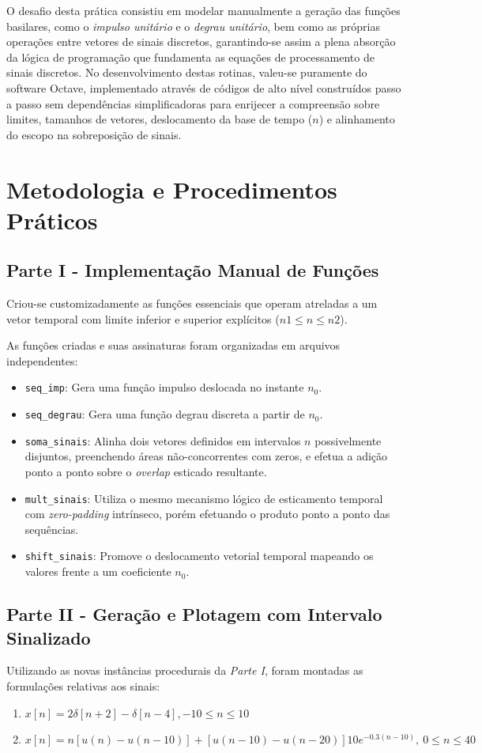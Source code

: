 \documentclass[tcc]{classe_uftex/uftex}
\begin{document}
O desafio desta prática consistiu em modelar manualmente a geração das funções basilares, como o \emph{impulso unitário} e o \emph{degrau unitário}, bem como as próprias operações entre vetores de sinais discretos, garantindo-se assim a plena absorção da lógica de programação que fundamenta as equações de processamento de sinais discretos. No desenvolvimento destas rotinas, valeu-se puramente do software Octave, implementado através de códigos de alto nível construídos passo a passo sem dependências simplificadoras para enrijecer a compreensão sobre limites, tamanhos de vetores, deslocamento da base de tempo ($n$) e alinhamento do escopo na sobreposição de sinais.

\chapter{Metodologia e Procedimentos Práticos}

\section{Parte I - Implementação Manual de Funções}
Criou-se customizadamente as funções essenciais que operam atreladas a um vetor temporal com limite inferior e superior explícitos ($n1 \le n \le n2$).

As funções criadas e suas assinaturas foram organizadas em arquivos independentes:
\begin{itemize}
    \item[\textbf{a)}] \texttt{seq\_imp}: Gera uma função impulso deslocada no instante $n_0$.
    \item[\textbf{b)}] \texttt{seq\_degrau}: Gera uma função degrau discreta a partir de $n_0$.
    \item[\textbf{c)}] \texttt{soma\_sinais}: Alinha dois vetores definidos em intervalos $n$ possivelmente disjuntos, preenchendo áreas não-concorrentes com zeros, e efetua a adição ponto a ponto sobre o \emph{overlap} esticado resultante.
    \item[\textbf{d)}] \texttt{mult\_sinais}: Utiliza o mesmo mecanismo lógico de esticamento temporal com \emph{zero-padding} intrínseco, porém efetuando o produto ponto a ponto das sequências.
    \item[\textbf{e)}] \texttt{shift\_sinais}: Promove o deslocamento vetorial temporal mapeando os valores frente a um coeficiente $n_0$.
\end{itemize}


\section{Parte II - Geração e Plotagem com Intervalo Sinalizado}
Utilizando as novas instâncias procedurais da \emph{Parte I}, foram montadas as formulações relativas aos sinais:
\begin{enumerate}
    \item[\textbf{a)}] $x[n] = 2\delta[n + 2] - \delta[n - 4], -10 \leq n \leq 10$
    \item[\textbf{b)}] $x[n] = n[u(n) - u(n - 10)] + [u(n - 10) - u(n - 20)]10e^{-0.3(n-10)}, \ 0 \leq n \leq 40$
\end{enumerate}
\end{document}
